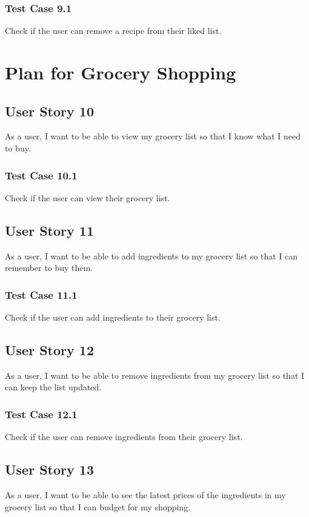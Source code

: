 \documentclass[11pt, letterpaper]{report}
\begin{document}
\subsubsection{Test Case 9.1}
Check if the user can remove a recipe from their liked list.

\section{Plan for Grocery Shopping}

\subsection{User Story 10}
As a user, I want to be able to view my grocery list so that I know what I need to buy.

\subsubsection{Test Case 10.1}
Check if the user can view their grocery list.

\subsection{User Story 11}
As a user, I want to be able to add ingredients to my grocery list so that I can remember to buy them.

\subsubsection{Test Case 11.1}
Check if the user can add ingredients to their grocery list.

\subsection{User Story 12}
As a user, I want to be able to remove ingredients from my grocery list so that I can keep the list updated.

\subsubsection{Test Case 12.1}
Check if the user can remove ingredients from their grocery list.

\subsection{User Story 13}
As a user, I want to be able to see the latest prices of the ingredients in my grocery list so that I can budget for my shopping.
\end{document}

